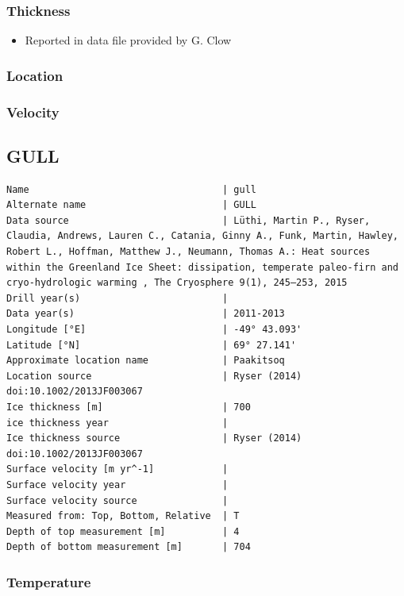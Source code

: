 \documentclass[article,a4paper,times,11pt,twoside]{article}
\begin{document}
\subsubsection{Thickness}
\label{sec:orga051be0}

\begin{itemize}
\item Reported in data file provided by G. Clow
\end{itemize}

\subsubsection{Location}
\label{sec:org19ed331}

\subsubsection{Velocity}
\label{sec:orgbf713ce}
\clearpage
\subsection{GULL}
\label{sec:org0140af2}
\begin{verbatim}
Name                                  | gull
Alternate name                        | GULL
Data source                           | Lüthi, Martin P., Ryser, Claudia, Andrews, Lauren C., Catania, Ginny A., Funk, Martin, Hawley, Robert L., Hoffman, Matthew J., Neumann, Thomas A.: Heat sources within the Greenland Ice Sheet: dissipation, temperate paleo-firn and cryo-hydrologic warming , The Cryosphere 9(1), 245–253, 2015 
Drill year(s)                         | 
Data year(s)                          | 2011-2013
Longitude [°E]                        | -49° 43.093'
Latitude [°N]                         | 69° 27.141'
Approximate location name             | Paakitsoq
Location source                       | Ryser (2014) doi:10.1002/2013JF003067
Ice thickness [m]                     | 700
ice thickness year                    | 
Ice thickness source                  | Ryser (2014) doi:10.1002/2013JF003067
Surface velocity [m yr^-1]            | 
Surface velocity year                 | 
Surface velocity source               | 
Measured from: Top, Bottom, Relative  | T
Depth of top measurement [m]          | 4
Depth of bottom measurement [m]       | 704
\end{verbatim}

\subsubsection{Temperature}
\label{sec:org8b41804}
\end{document}
